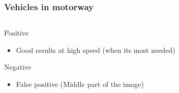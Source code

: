 \documentclass{beamer}
\begin{document}
\begin{frame}
	\end{frame}
	\begin{frame}
		\frametitle{Vehicles in motorway}
		\begin{columns}[t]
			\begin{column}[t]{5cm}
				\begin{exampleblock}{Positive}
				\begin{itemize}
				\item Good results at high speed (when its most needed)
				\end{itemize}
				\end{exampleblock}
								
				\begin{alertblock}{Negative}
				\begin{itemize}
				\item False positive (Middle part of the image)
				\end{itemize}
				\end{alertblock}					
		

\end{column}
\end{columns}
\end{frame}
\end{document}
